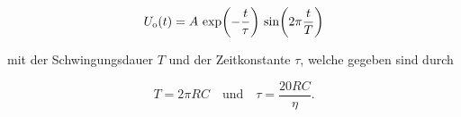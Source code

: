 \begin{equation}
    U_\text{o}(t) = A \, \exp \l(-\frac{t}{\tau}\r) \, \sin \l(2 \pi \frac{t}{T}\r)
    \label{eq:GeneratorMitVariierenderAmplitudeLoesung}
\end{equation}

mit der Schwingungsdauer $T$ und der Zeitkonstante $\tau$, welche gegeben sind durch

\begin{equation}
    T = 2 \pi RC \quad \text{und} \quad \tau = \frac{20 RC}{\eta}.
    \label{eq:generatorMitVariierenderAmplitude}
\end{equation}